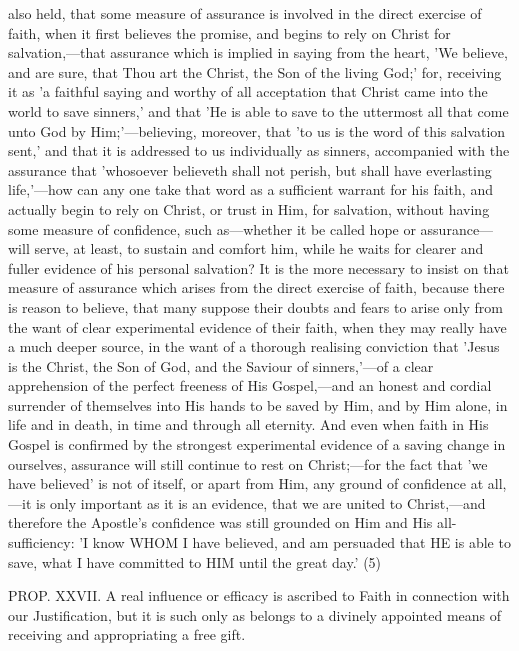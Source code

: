 \documentclass[
]{book}
\begin{document}
also held, that some measure of assurance is involved in the direct exercise of faith, when it first believes the promise, and begins to rely on Christ for salvation,---that assurance which is implied in saying from the heart, 'We believe, and are sure, that Thou art the Christ, the Son of the living God;' for, receiving it as 'a faithful saying and worthy of all acceptation that Christ came into the world to save sinners,' and that 'He is able to save to the uttermost all that come unto God by Him;'---believing, moreover, that 'to us is the word of this salvation sent,' and that it is addressed to us individually as sinners, accompanied with the assurance that 'whosoever believeth shall not perish, but shall have everlasting life,'---how can any one take that word as a sufficient warrant for his faith, and actually begin to rely on Christ, or trust in Him, for salvation, without having some measure of confidence, such as---whether it be called hope or assurance---will serve, at least, to sustain and comfort him, while he waits for clearer and fuller evidence of his personal salvation? It is the more necessary to insist on that measure of assurance which arises from the direct exercise of faith, because there is reason to believe, that many suppose their doubts and fears to arise only from the want of clear experimental evidence of their faith, when they may really have a much deeper source, in the want of a thorough realising conviction that 'Jesus is the Christ, the Son of God, and the Saviour of sinners,'---of a clear apprehension of the perfect freeness of His Gospel,---and an honest and cordial surrender of themselves into His hands to be saved by Him, and by Him alone, in life and in death, in time and through all eternity. And even when faith in His Gospel is confirmed by the strongest experimental evidence of a saving change in ourselves, assurance will still continue to rest on Christ;---for the fact that 'we have believed' is not of itself, or apart from Him, any ground of confidence at all,---it is only important as it is an evidence, that we are united to Christ,---and therefore the Apostle's confidence was still grounded on Him and His all-sufficiency: 'I know WHOM I have believed, and am persuaded that HE is able to save, what I have committed to HIM until the great day.' (5)

PROP. XXVII. A real influence or efficacy is ascribed to Faith in connection with our Justification, but it is such only as belongs to a divinely appointed means of receiving and appropriating a free gift.
\end{document}

